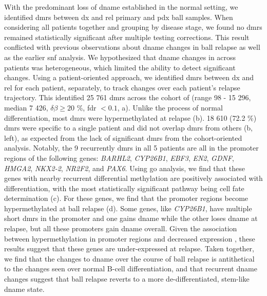 With the predominant loss of \gls{dname} established in the normal setting, we identified \glspl{dmr} between \gls{dx} and \gls{rel} primary and \gls{pdx} \gls{ball} samples.
When considering all patients together and grouping by disease stage, we found no \glspl{dmr} remained statistically significant after multiple testing corrections.
This result conflicted with previous observations about \gls{dname} changes in \gls{ball} relapse \cite{leeEpigeneticRemodelingBcell2015,nordlundGenomewideSignaturesDifferential2013} as well as the earlier \gls{snf} analysis.
We hypothesized that \gls{dname} changes in across patients was heterogeneous, which limited the ability to detect significant changes.
Using a patient-oriented approach, we identified \glspl{dmr} between \gls{dx} and \gls{rel} for each patient, separately, to track changes over each patient's relapse trajectory.
This identified 25 761 \glspl{dmr} across the cohort of (range 98 - 15 296, median 7 426, $\delta \beta \ge 20$ \%, \gls{fdr} $< 0.1$, a).
Unlike the process of normal differentiation, most \glspl{dmr} were hypermethylated at relapse (b).
18 610 (72.2 \%) \glspl{dmr} were specific to a single patient and did not overlap \glspl{dmr} from others (b, left), as expected from the lack of significant \glspl{dmr} from the cohort-oriented analysis.
Notably, the 9 recurrently \glspl{dmr} in all 5 patients are all in the promoter regions of the following genes: \emph{BARHL2}, \emph{CYP26B1}, \emph{EBF3}, \emph{EN2}, \emph{GDNF}, \emph{HMGA2}, \emph{NKX2-2}, \emph{NR2F2}, and \emph{PAX6}.
Using \gls{go} analysis, we find that these genes with nearby recurrent differential methylation are positively associated with differentiation, with the most statistically significant pathway being cell fate determination (c).
For these genes, we find that the promoter regions become hypermethylated at \gls{ball} relapse (d).
Some genes, like \emph{CYP26B1}, have multiple short \glspl{dmr} in the promoter and one gains \gls{dname} while the other loses \gls{dname} at relapse, but all these promoters gain \gls{dname} overall.
Given the association between hypermethylation in promoter regions and decreased expression \cite{jonesFunctionsDNAMethylation2012}, these results suggest that these genes are under-expressed at relapse.
Taken together, we find that the changes to \gls{dname} over the course of \gls{ball} relapse is antithetical to the changes seen over normal B-cell differentiation, and that recurrent \gls{dname} changes suggest that \gls{ball} relapse reverts to a more de-differentiated, stem-like \gls{dname} state.

